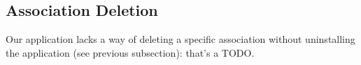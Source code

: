 \subsection{Association Deletion}
Our application lacks a way of deleting a specific association without uninstalling the application (see previous subsection): that's a TODO.